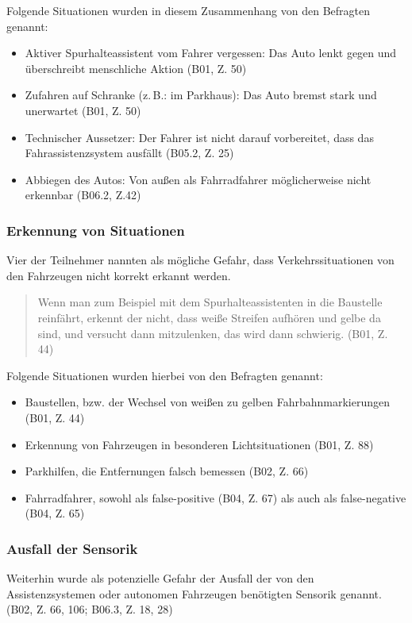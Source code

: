 \documentclass[12pt]{article}
\begin{document}
Folgende Situationen wurden in diesem Zusammenhang von den Befragten genannt:
\begin{itemize}
  \item Aktiver Spurhalteassistent vom Fahrer vergessen: Das Auto lenkt gegen und \glqq überschreibt\grqq{} menschliche Aktion (B01, Z. 50)
  \item Zufahren auf Schranke (z.\,B.: im Parkhaus): Das Auto bremst stark und unerwartet (B01, Z. 50)
  \item Technischer Aussetzer: Der Fahrer ist nicht darauf vorbereitet, dass das Fahrassistenzsystem ausfällt (B05.2, Z. 25)
  \item Abbiegen des Autos: Von außen als Fahrradfahrer möglicherweise nicht erkennbar (B06.2, Z.42)
\end{itemize}

\subsubsection*{Erkennung von Situationen}
Vier der Teilnehmer nannten als mögliche Gefahr, dass Verkehrssituationen von den Fahrzeugen nicht korrekt erkannt werden.

\begin{quote}
  Wenn man zum Beispiel mit dem Spurhalteassistenten in die Baustelle reinfährt, erkennt der nicht, dass weiße Streifen aufhören und gelbe da sind, und versucht dann mitzulenken, das wird dann schwierig. (B01, Z. 44)
\end{quote}

Folgende Situationen wurden hierbei von den Befragten genannt:
\begin{itemize}
  \item Baustellen, bzw. der Wechsel von weißen zu gelben Fahrbahnmarkierungen (B01, Z. 44)
  \item Erkennung von Fahrzeugen in besonderen Lichtsituationen (B01, Z. 88)
  \item Parkhilfen, die Entfernungen falsch bemessen (B02, Z. 66)
  \item Fahrradfahrer, sowohl als false-positive (B04, Z. 67) als auch als false-negative (B04, Z. 65)
\end{itemize}

\subsubsection*{Ausfall der Sensorik}
Weiterhin wurde als potenzielle Gefahr der Ausfall der von den Assistenzsystemen oder autonomen Fahrzeugen benötigten Sensorik genannt. (B02, Z. 66, 106; B06.3, Z. 18, 28)
\end{document}
